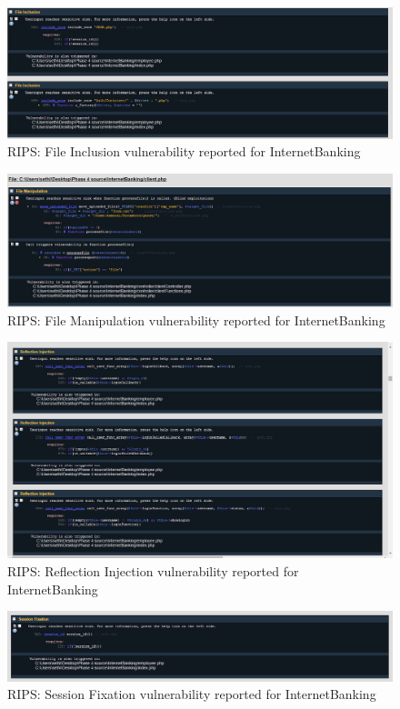 \begin{figure}[ht]
	\centering
	\includegraphics[width=.8\linewidth]{figures/rips_file_inclusion.png}
	\caption{RIPS: File Inclusion vulnerability reported for InternetBanking}
	\label{fig:rips_file_inclusion}
\end{figure}

\begin{figure}[ht]
	\centering
	\includegraphics[width=.8\linewidth]{figures/rips_file_manipulation.png}
	\caption{RIPS: File Manipulation vulnerability reported for InternetBanking}
	\label{fig:rips_file_manipulation}
\end{figure}

\begin{figure}[ht]
	\centering
	\includegraphics[width=.8\linewidth]{figures/rips_reflection_injection.png}
	\caption{RIPS: Reflection Injection vulnerability reported for InternetBanking}
	\label{fig:rips_reflection_injection}
\end{figure}

\begin{figure}[ht]
	\centering
	\includegraphics[width=.8\linewidth]{figures/rips_session_fixation.png}
	\caption{RIPS: Session Fixation vulnerability reported for InternetBanking}
	\label{fig:rips_session_fixation}
\end{figure}


